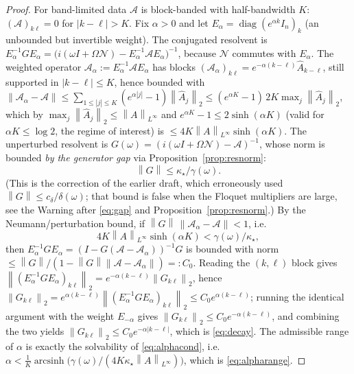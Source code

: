 \documentclass{amsart}
\theoremstyle{definition}
\DeclareMathOperator{\diag}{diag}
\newcommand{\norm}[1]{\left\lVert#1\right\rVert}
\newcommand{\Acal}{\mathcal{A}}
\newcommand{\Ncal}{\mathcal{N}}
\begin{document}
\begin{proof}
For band-limited data $\Acal$ is block-banded with half-bandwidth $K$:
$(\Acal)_{k\ell}=0$ for $|k-\ell|>K$. Fix $\alpha>0$ and let
$E_\alpha=\diag(e^{\alpha k}I_n)_{k}$ (an unbounded but invertible weight). The
conjugated resolvent is
$E_\alpha^{-1}G E_\alpha=\big(i(\omega I+\Omega\Ncal)-E_\alpha^{-1}\Acal E_\alpha\big)^{-1}$,
because $\Ncal$ commutes with $E_\alpha$. The weighted operator
$\Acal_\alpha:=E_\alpha^{-1}\Acal E_\alpha$ has blocks
$(\Acal_\alpha)_{k\ell}=e^{-\alpha(k-\ell)}\hat A_{k-\ell}$, still supported in
$|k-\ell|\le K$, hence bounded with
$\norm{\Acal_\alpha-\Acal}\le \sum_{1\le|j|\le K}(e^{\alpha|j|}-1)\norm{\hat A_j}_2
\le (e^{\alpha K}-1)\,2K\max_j\norm{\hat A_j}_2$, which by
$\max_j\norm{\hat A_j}_2\le\norm{A}_{L^\infty}$ and $e^{\alpha K}-1\le
2\sinh(\alpha K)$ (valid for $\alpha K\le\log 2$, the regime of interest) is
$\le 4K\norm{A}_{L^\infty}\sinh(\alpha K)$. The unperturbed
resolvent is $G(\omega)=(i(\omega I+\Omega\Ncal)-\Acal)^{-1}$, whose norm is
bounded \emph{by the generator gap} via Proposition~\ref{prop:resnorm}:
\[
\norm{G}\le \kappa_\star/\gamma(\omega).
\]
(This is the correction of the earlier draft, which erroneously used
$\norm{G}\le c_\delta/\delta(\omega)$; that bound is false when the Floquet
multipliers are large, see the Warning after \eqref{eq:gap} and
Proposition~\ref{prop:resnorm}.) By the
Neumann/perturbation bound, if
$\norm{G}\,\norm{\Acal_\alpha-\Acal}<1$, i.e.
\begin{equation}\label{eq:alphacond}
4K\norm{A}_{L^\infty}\sinh(\alpha K)<\gamma(\omega)/\kappa_\star,
\end{equation}
then $E_\alpha^{-1}GE_\alpha=(I-G(\Acal-\Acal_\alpha))^{-1}G$ is bounded with norm
$\le \norm{G}/(1-\norm{G}\norm{\Acal-\Acal_\alpha})=:C_0$. Reading the
$(k,\ell)$ block gives
$\norm{(E_\alpha^{-1}GE_\alpha)_{k\ell}}_2=e^{-\alpha(k-\ell)}\norm{G_{k\ell}}_2$,
hence $\norm{G_{k\ell}}_2=e^{\alpha(k-\ell)}\norm{(E_\alpha^{-1}GE_\alpha)_{k\ell}}_2
\le C_0 e^{\alpha(k-\ell)}$; running the identical argument with the weight
$E_{-\alpha}$ gives $\norm{G_{k\ell}}_2\le C_0 e^{-\alpha(k-\ell)}$, and
combining the two yields $\norm{G_{k\ell}}_2\le C_0 e^{-\alpha|k-\ell|}$, which is
\eqref{eq:decay}. The admissible range of $\alpha$ is exactly the solvability of
\eqref{eq:alphacond}, i.e.
$\alpha<\tfrac1K\operatorname{arcsinh}\!\big(\gamma(\omega)/(4K\kappa_\star\norm{A}_{L^\infty})\big)$,
which is \eqref{eq:alpharange}.
\end{proof}
\end{document}
